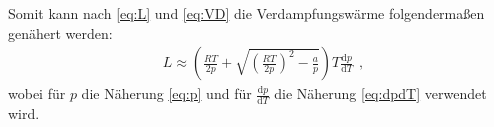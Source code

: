 Somit kann nach \eqref{eq:L} und \eqref{eq:VD} die Verdampfungswärme folgendermaßen genähert werden:
\begin{displaymath}
	\begin{aligned}
		L \approx \left(\frac{R T}{2 p} + \sqrt{\left(\frac{R T}{2p}\right)^2-\frac{a}{p}}\right) T \frac{\text{d} p}{\text{d} T}
	\end{aligned}\text{,}
\end{displaymath}
wobei für $p$ die Näherung \eqref{eq:p} und für $\frac{\text{d} p}{\text{d} T}$ die Näherung \eqref{eq:dpdT} verwendet wird.



